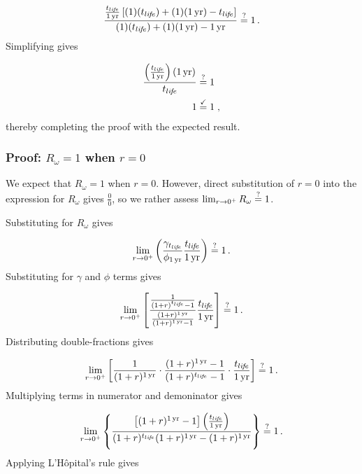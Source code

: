 \begin{equation}
  \frac{\frac{\tlife}{\oneyr}
              \left[ (1) (\tlife) + 
                     (1) (\oneyr) - 
                     \tlife
              \right]}
       {(1) (\tlife) + 
        (1) (\oneyr) - 
        \oneyr} \questionequal 1 \, .
\end{equation}
%
Simplifying gives

\begin{align}
  \frac{\left( \frac{t_{li\!f\!e}}{1\,\mathrm{yr}} \right) (1\,\mathrm{yr})}{t_{li\!f\!e}} &\stackrel{?}{=} 1 \\
  1 &\stackrel{\checkmark}{=} 1 \; ,
\end{align}
%
thereby completing the proof with the expected result. 



\subsubsection{Proof: $R_\omega = 1$ when $r = 0$}
\label{sec:proof_R_omega}

We expect that $R_\omega = 1$ when $r = 0$.
However, direct substitution of $r = 0$ into the expression
for $R_\omega$ gives $\frac{0}{0}$, 
so we rather assess
$\lim_{r \to 0^+} R_\omega \stackrel{?}{=} 1$.

Substituting for $R_\omega$ gives

\begin{equation}
  \lim_{r \to 0^+} \left( \frac{\gamma_{t_{li\!f\!e}}}{\phi_{1\,\mathrm{yr}}} \frac{t_{li\!f\!e}}{1\,\mathrm{yr}} \right) \stackrel{?}{=} 1 \, .
\end{equation}
%
Substituting for $\gamma$ and $\phi$ terms gives

\begin{equation}
  \lim_{r \to 0^+} \left[ \frac{\frac{1}{(1 + r)^{t_{li\!f\!e}} - 1}}{\frac{(1 + r)^{1\,\mathrm{yr}}}{(1 + r)^{1\,\mathrm{yr}} - 1}} \frac{t_{li\!f\!e}}{1\,\mathrm{yr}} \right] \stackrel{?}{=} 1 \, .
\end{equation}
%
Distributing double-fractions gives

\begin{equation}
  \lim_{r \to 0^+} \left[
  \frac{1}{(1 + r)^{1\,\mathrm{yr}}} \cdot
  \frac{(1 + r)^{1\,\mathrm{yr}} - 1}{(1 + r)^{t_{li\!f\!e}} - 1} \cdot
  \frac{t_{li\!f\!e}}{1\,\mathrm{yr}}
  \right] \stackrel{?}{=} 1 \, .
\end{equation}
%
Multiplying terms in numerator and demoninator gives

\begin{equation}
  \lim_{r \to 0^+} 
  \left\{
    \frac{\left[ (1 + r)^{1\,\mathrm{yr}} - 1 \right] \left( \frac{t_{li\!f\!e}}{1\,\mathrm{yr}} \right)}
    {(1 + r)^{t_{li\!f\!e}} (1 + r)^{1\,\mathrm{yr}} - (1 + r)^{1\,\mathrm{yr}}} 
  \right\} \stackrel{?}{=} 1 \, .
\end{equation}
%
Applying L'H\^{o}pital's rule gives

